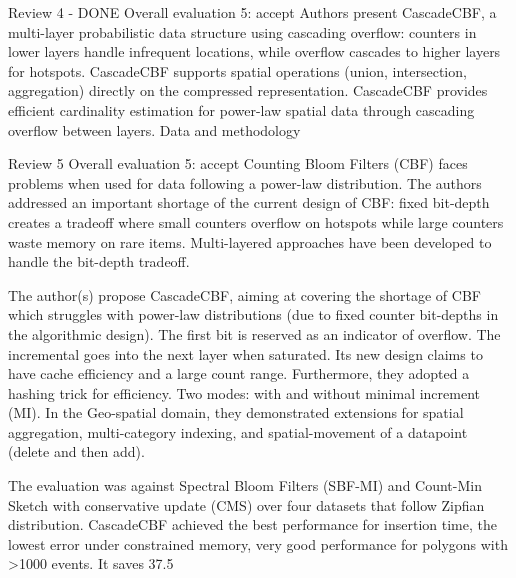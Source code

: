 Review 4 - DONE
Overall evaluation	
5: accept
Authors present CascadeCBF, a multi-layer probabilistic data structure using cascading overflow:
counters in lower layers handle infrequent locations, while overflow cascades to higher layers for hotspots.
CascadeCBF supports spatial operations (union, intersection, aggregation) directly on the compressed
representation.
CascadeCBF provides efficient cardinality estimation for power-law spatial data through cascading overflow
between layers.
Data and methodology	


Review 5
Overall evaluation	
5: accept
Counting Bloom Filters (CBF) faces problems when used for data following a power-law distribution. The authors addressed an important shortage of the current design of CBF: fixed bit-depth creates a tradeoff where small counters overflow on hotspots while large counters waste memory on rare items. Multi-layered approaches have been developed to handle the bit-depth tradeoff.

The author(s) propose CascadeCBF, aiming at covering the shortage of CBF which struggles with power-law distributions (due to fixed counter bit-depths in the algorithmic design). The first bit is reserved as an indicator of overflow. The incremental goes into the next layer when saturated. Its new design claims to have cache efficiency and a large count range. Furthermore, they adopted a hashing trick for efficiency. Two modes: with and without minimal increment (MI). In the Geo-spatial domain, they demonstrated extensions for spatial aggregation, multi-category indexing, and spatial-movement of a datapoint (delete and then add).

The evaluation was against Spectral Bloom Filters (SBF-MI) and Count-Min Sketch with conservative update (CMS) over four datasets that follow Zipfian distribution. CascadeCBF achieved the best performance for insertion time, the lowest error under constrained memory, very good performance for polygons with >1000 events. It saves 37.5%


